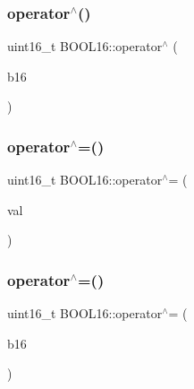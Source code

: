 \hypertarget{struct_b_o_o_l16_ae532dbe4dfd626485645e8514001b121}{}\label{struct_b_o_o_l16_ae532dbe4dfd626485645e8514001b121} 
\subsubsection{\texorpdfstring{operator$^\wedge$()}{operator^()}\hspace{0.1cm}{\footnotesize\ttfamily [2/2]}}
{\footnotesize\ttfamily uint16\+\_\+t B\+O\+O\+L16\+::operator$^\wedge$ (\begin{DoxyParamCaption}\item[{const \hyperlink{struct_b_o_o_l16}{B\+O\+O\+L16}}]{b16 }\end{DoxyParamCaption})\hspace{0.3cm}{\ttfamily [inline]}}

\hypertarget{struct_b_o_o_l16_a69c5e6a6fb7e8651b24ff01caf070d21}{}\label{struct_b_o_o_l16_a69c5e6a6fb7e8651b24ff01caf070d21} 
\subsubsection{\texorpdfstring{operator$^\wedge$=()}{operator^=()}\hspace{0.1cm}{\footnotesize\ttfamily [1/2]}}
{\footnotesize\ttfamily uint16\+\_\+t B\+O\+O\+L16\+::operator$^\wedge$= (\begin{DoxyParamCaption}\item[{const uint16\+\_\+t}]{val }\end{DoxyParamCaption})\hspace{0.3cm}{\ttfamily [inline]}}

\hypertarget{struct_b_o_o_l16_af929bd77944f9877968203b9ddf3d110}{}\label{struct_b_o_o_l16_af929bd77944f9877968203b9ddf3d110} 
\subsubsection{\texorpdfstring{operator$^\wedge$=()}{operator^=()}\hspace{0.1cm}{\footnotesize\ttfamily [2/2]}}
{\footnotesize\ttfamily uint16\+\_\+t B\+O\+O\+L16\+::operator$^\wedge$= (\begin{DoxyParamCaption}\item[{const \hyperlink{struct_b_o_o_l16}{B\+O\+O\+L16}}]{b16 }\end{DoxyParamCaption})\hspace{0.3cm}{\ttfamily [inline]}}

